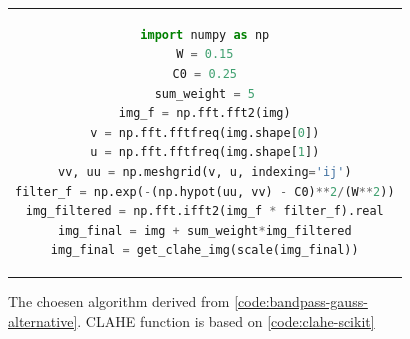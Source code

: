 \begin{figure}[htpb]
	\begin{tabular}{c}
	\begin{lstlisting}[language=Python]
import numpy as np
W = 0.15
C0 = 0.25
sum_weight = 5
img_f = np.fft.fft2(img)
v = np.fft.fftfreq(img.shape[0])
u = np.fft.fftfreq(img.shape[1])
vv, uu = np.meshgrid(v, u, indexing='ij')
filter_f = np.exp(-(np.hypot(uu, vv) - C0)**2/(W**2))
img_filtered = np.fft.ifft2(img_f * filter_f).real
img_final = img + sum_weight*img_filtered
img_final = get_clahe_img(scale(img_final))
	\end{lstlisting}
	\end{tabular}
	\caption[Example listing]{The choesen algorithm derived from \ref{code:bandpass-gauss-alternative}. CLAHE function is based on \ref{code:clahe-scikit}}
\label{code:chosen-algorithm}
\end{figure}


